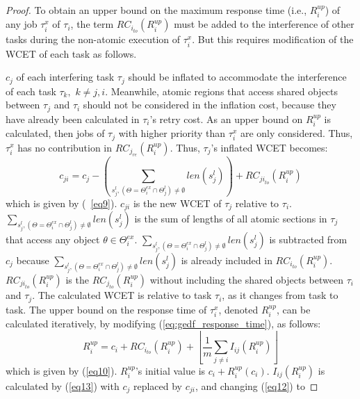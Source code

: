 \begin{proof}
%
To obtain an upper bound on the maximum response time (i.e., $R_i^{up}$) of any job $\tau_i^x$ of $\tau_{i}$, the term $RC_{i_{to}}(R_i^{up})$ must be added to the interference of other tasks during the non-atomic
execution of $\tau_{i}^x$. But this requires modification of the WCET of each
task as follows. 

$c_{j}$ of each interfering task $\tau_{j}$ should be inflated to accommodate the interference of each task $\tau_{k},$ $k\ne j,i$. Meanwhile, atomic regions that access shared objects between $\tau_{j}$ and $\tau_{i}$ should not be considered in the inflation cost, because they have already been calculated in $\tau_{i}$'s retry cost. As an upper bound on $R_i^{up}$ is calculated, then jobs of $\tau_j$ with higher priority than $\tau_i^x$ are only considered. Thus, $\tau_i^x$ has no contribution in $RC_{j_{re}}(R_i^{up})$. Thus, $\tau_{j}$'s inflated WCET becomes:
%
\begin{equation*}
c_{ji}=c_{j}-\left(\sum_{s_j^l,\left(\Theta=\Theta_i^{ex} \cap \Theta_j^l\right)\neq \emptyset}len \left(s_j^l \right) \right)+RC_{{ji}_{to}}(R_i^{up})
\end{equation*}
%
which is given by (~\ref{eq9}). $c_{ji}$ is the new WCET of $\tau_{j}$ relative to $\tau_{i}$. $\sum_{s_j^l,\left(\Theta=\Theta_i^{ex} \cap \Theta_j^l\right)\neq \emptyset} {len(s_j^l)}$ is the sum of lengths of all atomic sections in $\tau_{j}$ that access any object $\theta \in \Theta_i^{ex}$. $\sum_{s_j^l, \left(\Theta=\Theta_i^{ex} \cap \Theta_j^l\right)\neq \emptyset} \allowbreak {len(s_j^l)}$ is subtracted from $c_j$ because $\sum_{s_j^l,\left(\Theta=\Theta_i^{ex} \cap \Theta_j^l\right)\neq \emptyset} {len(s_j^l)}$ is already included in $RC_{i_{to}}(R_i^{up})$. $RC_{{ji}_{to}}(R_i^{up})$ is the $RC_{j_{to}}(R_i^{up})$ without including the shared objects between $\tau_{i}$ and $\tau_{j}$. The calculated WCET is relative to task $\tau_{i}$, as it changes from task to task. The upper bound on the response time of $\tau_{i}^x$, denoted $R_{i}^{up}$, can be calculated iteratively, by modifying (\ref{eq:gedf_response_time}), as follows:
\begin{equation*}
R_{i}^{up}=c_{i}+RC_{i_{to}}(R_i^{up})+\left\lfloor\frac{1}{m}\sum_{j\ne i}I_{ij}(R_{i}^{up})\right\rfloor
\end{equation*}
%
which is given by (\ref{eq10}). $R_{i}^{up}$'s initial value is $c_i + R_i^{up}(c_i)$.
%
$I_{ij}(R_{i}^{up})$ is calculated by (\ref{eq13}) with $c_{j}$ replaced by 
$c_{ji}$, and changing (\ref{eq12}) to

\end{proof}
